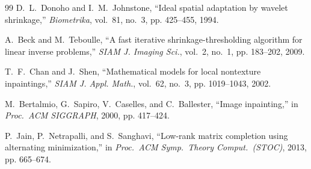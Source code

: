 \documentclass[journal,onecolumn,11pt]{IEEEtran}
\theoremstyle{definition}
\begin{document}
\begin{thebibliography}{99}
D.~L.~Donoho and I.~M.~Johnstone,
``Ideal spatial adaptation by wavelet shrinkage,''
\emph{Biometrika}, vol.~81, no.~3, pp. 425--455, 1994.

A.~Beck and M.~Teboulle,
``A fast iterative shrinkage-thresholding algorithm for linear inverse
problems,''
\emph{SIAM J. Imaging Sci.}, vol.~2, no.~1, pp. 183--202, 2009.

T.~F.~Chan and J.~Shen,
``Mathematical models for local nontexture inpaintings,''
\emph{SIAM J. Appl. Math.}, vol.~62, no.~3, pp. 1019--1043, 2002.

M.~Bertalmio, G.~Sapiro, V.~Caselles, and C.~Ballester,
``Image inpainting,''
in \emph{Proc.\ ACM SIGGRAPH}, 2000, pp. 417--424.

P.~Jain, P.~Netrapalli, and S.~Sanghavi,
``Low-rank matrix completion using alternating minimization,''
in \emph{Proc.\ ACM Symp.\ Theory Comput.\ (STOC)}, 2013, pp. 665--674.

\end{thebibliography}
\end{document}
